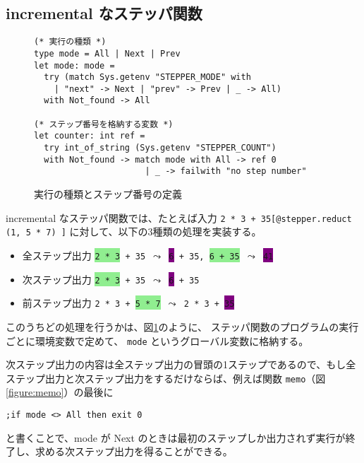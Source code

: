 \subsection{incremental なステッパ関数}

\begin{figure}[t]
\begin{spacing}{0.8}
\begin{verbatim}
(* 実行の種類 *)
type mode = All | Next | Prev
let mode: mode =
  try (match Sys.getenv "STEPPER_MODE" with
    | "next" -> Next | "prev" -> Prev | _ -> All)
  with Not_found -> All

(* ステップ番号を格納する変数 *)
let counter: int ref =
  try int_of_string (Sys.getenv "STEPPER_COUNT")
  with Not_found -> match mode with All -> ref 0
                      | _ -> failwith "no step number"
\end{verbatim}
\end{spacing}
\caption{実行の種類とステップ番号の定義}
\label{figure:mode}
\end{figure}

incremental なステッパ関数では、たとえば入力 \texttt{2 * 3 + 35[@stepper.reduct (1, 5 * 7) ]} に対して、以下の3種類の処理を実装する。

\begin{itemize}
\item 全ステップ出力 \texttt{\colorbox{lightgreen}{2 * 3} + 35 $\leadsto$ \colorbox{purple}{6} + 35, \colorbox{lightgreen}{6 + 35} $\leadsto$ \colorbox{purple}{41}}
\item 次ステップ出力 \texttt{\colorbox{lightgreen}{2 * 3} + 35 $\leadsto$ \colorbox{purple}{6} + 35}
\item 前ステップ出力 \texttt{2 * 3 + \colorbox{lightgreen}{5 * 7} $\leadsto$ 2 * 3 + \colorbox{purple}{35}}
\end{itemize}

このうちどの処理を行うかは、図\ref{figure:mode}のように、
ステッパ関数のプログラムの実行ごとに環境変数で定めて、
\texttt{mode} というグローバル変数に格納する。

次ステップ出力の内容は全ステップ出力の冒頭の1ステップであるので、もし全ステップ出力と次ステップ出力をするだけならば、例えば関数 \texttt{memo}（図\ref{figure:memo}）の最後に
\begin{verbatim}
;if mode <> All then exit 0
\end{verbatim}
と書くことで、mode が Next のときは最初のステップしか出力されず実行が終了し、求める次ステップ出力を得ることができる。

